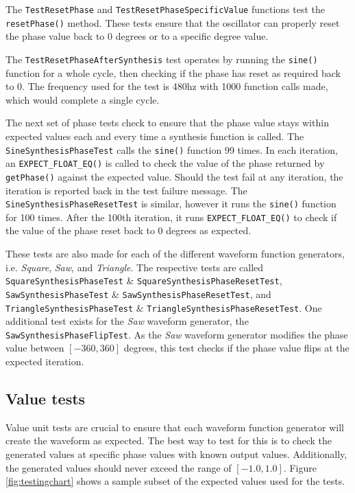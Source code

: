 \documentclass[a4paper,12pt]{report}
\begin{document}
The \texttt{Test\-Reset\-Phase} and \texttt{Test\-Reset\-Phase\-Specific\-Value} functions test the \texttt{reset\-Phase()} method. These tests ensure that the oscillator can properly reset the phase value back to 0 degrees or to a specific degree value.

The \texttt{Test\-Reset\-Phase\-After\-Synthesis} test operates by running the \texttt{sine()} function for a whole cycle, then checking if the phase has reset as required back to 0. The frequency used for the test is 480hz with 1000 function calls made, which would complete a single cycle.

The next set of phase tests check to ensure that the phase value stays within expected values each and every time a synthesis function is called. The \texttt{Sine\-Synthesis\-Phase\-Test} calls the \texttt{sine()} function 99 times. In each iteration, an \texttt{EXPECT\_FLOAT\_EQ()} is called to check the value of the phase returned by \texttt{getPhase()} against the expected value. Should the test fail at any iteration, the iteration is reported back in the test failure message. The \texttt{Sine\-Synthesis\-Phase\-Reset\-Test} is similar, however it runs the \texttt{sine()} function for 100 times. After the 100th iteration, it runs \texttt{EXPECT\-\_FLOAT\-\_EQ()} to check if the value of the phase reset back to 0 degrees as expected.

These tests are also made for each of the different waveform function generators, i.e. \emph{Square}, \emph{Saw}, and \emph{Triangle}. The respective tests are called \texttt{Square\-Synthesis\-Phase\-Test} \& \texttt{Square\-Synthesis\-Phase\-Reset\-Test}, \texttt{Saw\-Synthesis\-Phase\-Test} \& \texttt{Saw\-Synthesis\-Phase\-Reset\-Test}, and \texttt{Triangle\-Synthesis\-Phase\-Test} \& \texttt{Triangle\-Synthesis\-Phase\-Reset\-Test}. One additional test exists for the \emph{Saw} waveform generator, the \texttt{Saw\-Synthesis\-Phase\-Flip\-Test}. As the \emph{Saw} waveform generator modifies the phase value between $[-360,360]$ degrees, this test checks if the phase value flips at the expected iteration.

\subsection{Value tests}
\label{subsec:valuetests}
Value unit tests are crucial to ensure that each waveform function generator will create the waveform as expected. The best way to test for this is to check the generated values at specific phase values with known output values. Additionally, the generated values should never exceed the range of $[-1.0,1.0]$. Figure \ref{fig:testingchart} shows a sample subset of the expected values used for the tests.
\end{document}
